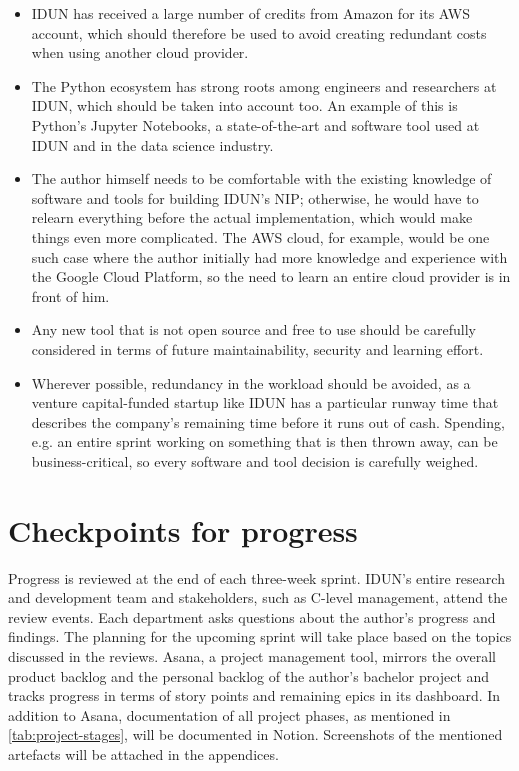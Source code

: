 \begin{itemize}
    \item IDUN has received a large number of credits from Amazon for its AWS account, which should therefore be used to avoid creating redundant costs when using another cloud provider.
    \item The Python ecosystem has strong roots among engineers and researchers at IDUN, which should be taken into account too. An example of this is Python's Jupyter Notebooks, a state-of-the-art and software tool used at IDUN and in the data science industry.
    \item The author himself needs to be comfortable with the existing knowledge of software and tools for building IDUN's NIP; otherwise, he would have to relearn everything before the actual implementation, which would make things even more complicated. The AWS cloud, for example, would be one such case where the author initially had more knowledge and experience with the Google Cloud Platform, so the need to learn an entire cloud provider is in front of him.
    \item Any new tool that is not open source and free to use should be carefully considered in terms of future maintainability, security and learning effort.
    \item Wherever possible, redundancy in the workload should be avoided, as a venture capital-funded startup like IDUN has a particular runway time that describes the company's remaining time before it runs out of cash. Spending, e.g. an entire sprint working on something that is then thrown away, can be business-critical, so every software and tool decision is carefully weighed.
\end{itemize}

\section{Checkpoints for progress}
\label{chapter3-checkpoints-for-progress}

Progress is reviewed at the end of each three-week sprint. IDUN's entire research and development team and stakeholders, such as C-level management, attend the review events. Each department asks questions about the author's progress and findings. The planning for the upcoming sprint will take place based on the topics discussed in the reviews. Asana, a project management tool, mirrors the overall product backlog and the personal backlog of the author's bachelor project and tracks progress in terms of story points and remaining epics in its dashboard. In addition to Asana, documentation of all project phases, as mentioned in \autoref{tab:project-stages}, will be documented in Notion. Screenshots of the mentioned artefacts will be attached in the appendices.

